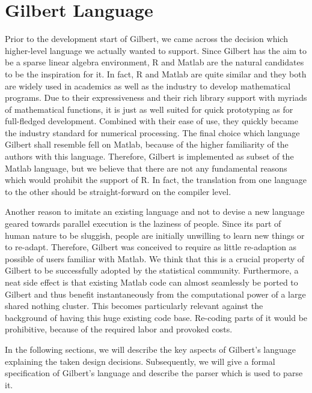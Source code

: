 \chapter{Gilbert Language}
\label{cha:gilbertlanguage}


Prior to the development start of Gilbert, we came across the decision which higher-level language we actually wanted to support.
Since Gilbert has the aim to be a sparse linear algebra environment, R and Matlab are the natural candidates to be the inspiration for it.
In fact, R and Matlab are quite similar and they both are widely used in academics as well as the industry to develop mathematical programs.
Due to their expressiveness and their rich library support with myriads of mathematical functions, it is just as well suited for quick prototyping as for full-fledged development.
Combined with their ease of use, they quickly became the industry standard for numerical processing.
The final choice which language Gilbert shall resemble fell on Matlab, because of the higher familiarity of the authors with this language.
Therefore, Gilbert is implemented as subset of the Matlab language, but we believe that there are not any fundamental reasons which would prohibit the support of R.
In fact, the translation from one language to the other should be straight-forward on the compiler level.

Another reason to imitate an existing language and not to devise a new language geared towards parallel execution is the laziness of people.
Since its part of human nature to be sluggish, people are initially unwilling to learn new things or to re-adapt.
Therefore, Gilbert was conceived to require as little re-adaption as possible of users familiar with Matlab.
We think that this is a crucial property of Gilbert to be successfully adopted by the statistical community.
Furthermore, a neat side effect is that existing Matlab code can almost seamlessly be ported to Gilbert and thus benefit instantaneously from the computational power of a large shared nothing cluster.
This becomes particularly relevant against the background of having this huge existing code base.
Re-coding parts of it would be prohibitive, because of the required labor and provoked costs.

In the following sections, we will describe the key aspects of Gilbert's language explaining the taken design decisions.
Subsequently, we will give a formal specification of Gilbert's language and describe the parser which is used to parse it.

